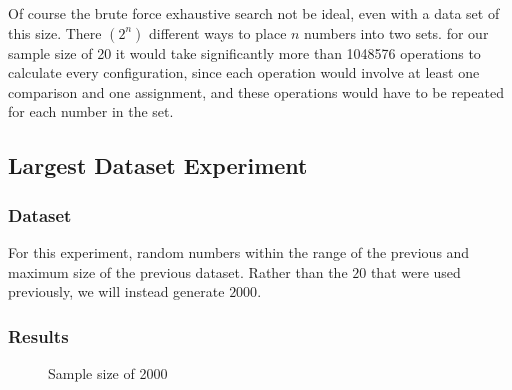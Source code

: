 \documentclass[a4paper]{article}
\begin{document}
Of course the brute force exhaustive search not be ideal, even with a data set of this size. 
There $(2^n)$ different ways to place $n$ numbers into two sets.
for our sample size of 20 it would take significantly 
more than 1048576 operations to calculate every configuration,
since each operation would involve at least one comparison and one assignment,
and these operations would have to be repeated for each number in the set.



\newpage



\subsection{Largest Dataset Experiment}


\subsubsection{Dataset}

For this experiment, random numbers within the range of the previous and maximum size 
of the previous dataset. Rather than the $20$ that were used previously, we will instead 
generate $2000$.

\subsubsection{Results}

\begin{figure}[h]
  
\centering
\caption{Sample size of 2000}
\label{fig:x Mutation Plot}

\end{figure}
\end{document}

